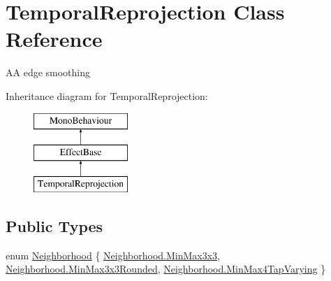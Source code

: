 \hypertarget{class_temporal_reprojection}{}\section{Temporal\+Reprojection Class Reference}
\label{class_temporal_reprojection}


AA edge smoothing  


Inheritance diagram for Temporal\+Reprojection\+:\begin{figure}[H]
\begin{center}
\leavevmode
\includegraphics[height=3.000000cm]{class_temporal_reprojection}
\end{center}
\end{figure}
\subsection*{Public Types}
\begin{DoxyCompactItemize}
\item 
enum \mbox{\hyperlink{class_temporal_reprojection_a6b3343c06d004430c301f11de9bc732c}{Neighborhood}} \{ \mbox{\hyperlink{class_temporal_reprojection_a6b3343c06d004430c301f11de9bc732ca297352ecf9ba7bad14f19d2c475bec4b}{Neighborhood.\+Min\+Max3x3}}, 
\mbox{\hyperlink{class_temporal_reprojection_a6b3343c06d004430c301f11de9bc732ca18aa98e3dd602e39b1c5ba8e71132360}{Neighborhood.\+Min\+Max3x3\+Rounded}}, 
\mbox{\hyperlink{class_temporal_reprojection_a6b3343c06d004430c301f11de9bc732ca7d8db4b480ddcb323347a4091a7a993a}{Neighborhood.\+Min\+Max4\+Tap\+Varying}}
 \}
\end{DoxyCompactItemize}
